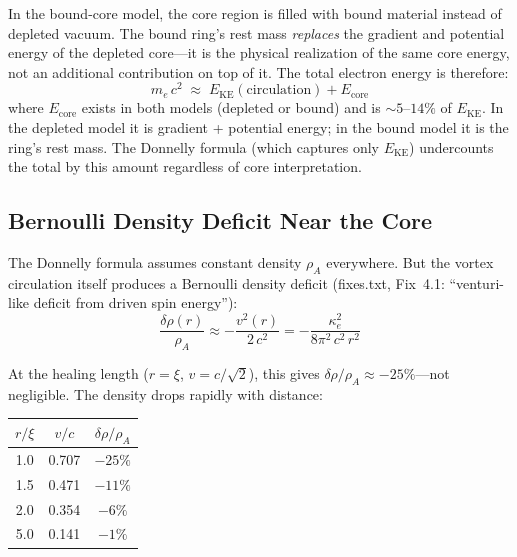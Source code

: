 \documentclass[12pt,letterpaper]{article}
\newcommand{\rhoa}{\rho_{\!A}}
\begin{document}
In the bound-core model, the core region is filled with bound material
instead of depleted vacuum.  The bound ring's rest mass \emph{replaces} the
gradient and potential energy of the depleted core---it is the physical
realization of the same core energy, not an additional contribution on top of
it.  The total electron energy is therefore:
%
\begin{equation}
  m_e\,c^2 \;\approx\; E_{\mathrm{KE}}(\text{circulation})
  + E_{\mathrm{core}}
  \label{eq:me-general}
\end{equation}
%
where $E_{\mathrm{core}}$ exists in both models (depleted or bound) and is
$\sim\!5$--$14\%$ of $E_{\mathrm{KE}}$.  In the depleted model it is
gradient + potential energy; in the bound model it is the ring's rest mass.
The Donnelly formula (which captures only $E_{\mathrm{KE}}$) undercounts
the total by this amount regardless of core interpretation.

\subsection{Bernoulli Density Deficit Near the Core}
\label{sec:bernoulli-density}

The Donnelly formula assumes constant density $\rhoa$ everywhere.  But the
vortex circulation itself produces a Bernoulli density deficit (fixes.txt,
Fix~4.1: ``venturi-like deficit from driven spin energy''):
%
\begin{equation}
  \frac{\delta\rho(r)}{\rhoa} \approx -\frac{v^2(r)}{2\,c^2}
  = -\frac{\kappa_e^2}{8\pi^2\,c^2\,r^2}
  \label{eq:density-deficit}
\end{equation}

At the healing length ($r = \xi$, $v = c/\sqrt{2}$), this gives
$\delta\rho/\rhoa \approx -25\%$---not negligible.  The density drops
rapidly with distance:

\medskip
\begin{center}
\begin{tabular}{@{}ccc@{}}
\toprule
$r/\xi$ & $v/c$ & $\delta\rho/\rhoa$ \\
\midrule
1.0 & 0.707 & $-25\%$ \\
1.5 & 0.471 & $-11\%$ \\
2.0 & 0.354 & $-6\%$ \\
5.0 & 0.141 & $-1\%$ \\
\bottomrule
\end{tabular}
\end{center}
\medskip
\end{document}
